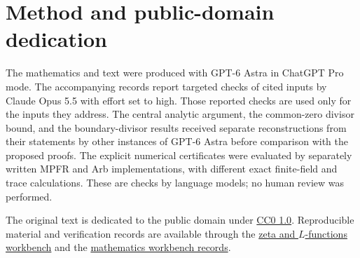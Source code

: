 \documentclass[11pt]{article}
\theoremstyle{definition}
\theoremstyle{remark}
\newcommand{\workbenchurl}{https://github.com/KokunoYumeto/zeta-and-l-functions-workbench}
\newcommand{\recordurl}{https://github.com/KokunoYumeto/mathematics-workbenches}
\numberwithin{equation}{section}
\begin{document}




\section*{Method and public-domain dedication}

The mathematics and text were produced with GPT-6 Astra in ChatGPT Pro mode. The accompanying records report targeted checks of cited inputs by Claude Opus 5.5 with effort set to high. Those reported checks are used only for the inputs they address. The central analytic argument, the common-zero divisor bound, and the boundary-divisor results received separate reconstructions from their statements by other instances of GPT-6 Astra before comparison with the proposed proofs. The explicit numerical certificates were evaluated by separately written MPFR and Arb implementations, with different exact finite-field and trace calculations. These are checks by language models; no human review was performed.

The original text is dedicated to the public domain under \href{https://creativecommons.org/publicdomain/zero/1.0/}{CC0 1.0}. Reproducible material and verification records are available through the \href{\workbenchurl}{zeta and $L$-functions workbench} and the \href{\recordurl}{mathematics workbench records}.
\end{document}

